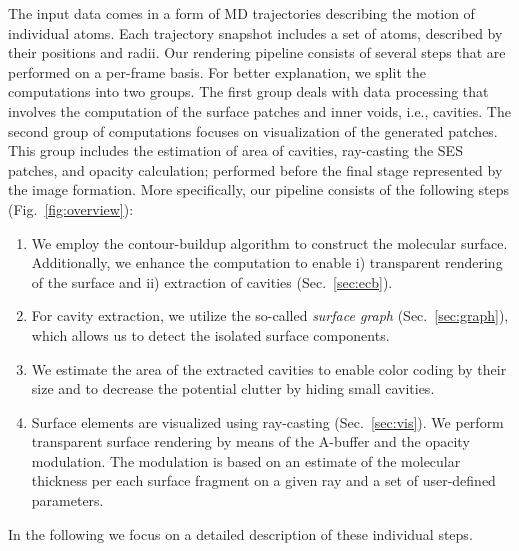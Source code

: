 The input data comes in a form of MD trajectories describing the motion of individual atoms. 
Each trajectory snapshot includes a set of atoms, described by their positions and radii. 
Our rendering pipeline consists of several steps that are performed on a per-frame basis. 
For better explanation, we split the computations into two groups. 
The first group deals with data processing that involves the computation of the surface patches and inner voids, i.e., cavities.
The second group of computations focuses on visualization of the generated patches. 
This group includes the estimation of area of cavities, ray-casting the SES patches, and opacity calculation; performed before the final stage represented by the image formation. 
More specifically, our pipeline consists of the following steps (Fig.~\ref{fig:overview}):
	\begin{enumerate}
	  \item We employ the contour-buildup algorithm to construct the molecular surface. Additionally, we enhance the computation to enable i) transparent rendering of the surface and ii) extraction of cavities (Sec.~\ref{sec:ecb}).
		\item For cavity extraction, we utilize the so-called \textit{surface graph} (Sec.~\ref{sec:graph}), which allows us to detect the isolated surface components.
		\item We estimate the area of the extracted cavities to enable color coding by their size and to decrease the potential clutter by hiding small cavities.
		\item Surface elements are visualized using ray-casting (Sec.~\ref{sec:vis}). We perform transparent surface rendering by means of the A-buffer and the opacity modulation. The modulation is based on an estimate of the molecular thickness per each surface fragment on a given ray and a set of user-defined parameters.
	\end{enumerate}
	
In the following we focus on a detailed description of these individual steps.